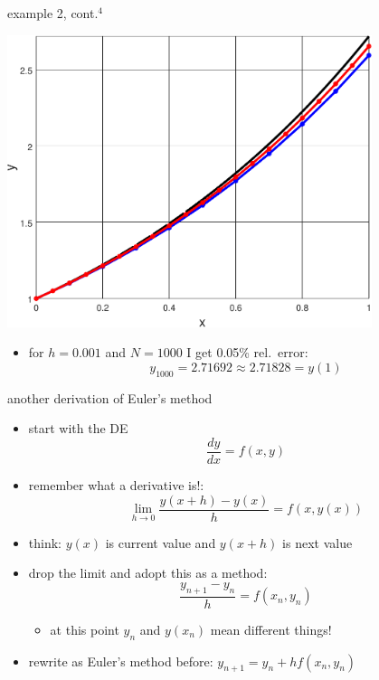 \documentclass[colorlinks]{beamer}
\begin{document}
\begin{frame}{example 2, cont.$^4$}

\begin{center}
\includegraphics[width=0.8\textwidth]{figs/simpleeuler}
\end{center}

\footnotesize
\begin{itemize}
\item for $h=0.001$ and $N=1000$ I get 0.05\% rel.~error:
   $$y_{1000} = 2.71692 \approx 2.71828 = y(1)$$
\end{itemize}
\end{frame}


\begin{frame}{another derivation of Euler's method}

\begin{itemize}
\item start with the DE
    $$\frac{dy}{dx} = f(x,y)$$
\item remember what a derivative is!:
    $$\lim_{h\to 0} \frac{y(x+h)-y(x)}{h} = f(x,y(x))$$
\item think: $y(x)$ is current value and $y(x+h)$ is next value
\item drop the limit and adopt this as a method:
    $$\frac{y_{n+1}-y_n}{h} = f(x_n,y_n)$$

\vspace{-2mm}
    \begin{itemize}
    \item at this point $y_n$ and $y(x_n)$ mean different things!
    \end{itemize}
\item rewrite as Euler's method before:  $y_{n+1} = y_n + h f(x_n,y_n)$
\end{itemize}
\end{frame}
\end{document}
